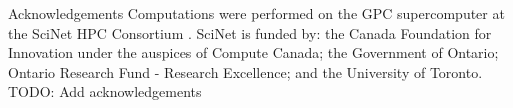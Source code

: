 \begin{section}{Acknowledgements}
  \label{sec:acknowledgements}
Computations were performed on the GPC supercomputer at the SciNet HPC Consortium \cite{bib:Loken}. SciNet is funded by: the Canada Foundation for Innovation under the auspices of Compute Canada; the Government of Ontario; Ontario Research Fund - Research Excellence; and the University of Toronto.
TODO: Add acknowledgements
\end{section}
